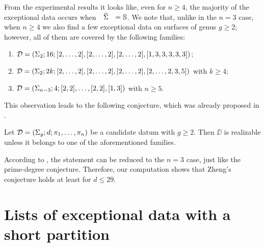 \egroup

From the experimental results it looks like, even for $n\ge 4$, the majority of the exceptional data occurs when $\tSigma=\sphere$. We note that, unlike in the $n=3$ case, when $n\ge 4$ we also find a few exceptional data on surfaces of genus $g\ge 2$; however,
all of them are covered by the following families:
\begin{enumerate}[(1)]
\item $\mathcal{D}=(\Sigma_{2};16;[2,\ldots,2],[2,\ldots,2],[2,\ldots,2],[1,3,3,3,3,3])$;
\item $\mathcal{D}=(\Sigma_{2};2k;[2,\ldots,2],[2,\ldots,2],[2,\ldots,2],[2,\ldots,2,3,5])$ with $k\ge 4$;
\item $\mathcal{D}=(\Sigma_{n-3};4;[2,2],\ldots,[2,2],[1,3])$ with $n\ge 5$.
\end{enumerate}
This observation leads to the following conjecture, which was already proposed in \cite{zheng}.
\begin{conjecture*}[Zheng]
Let $\mathcal{D}=(\Sigma_{g};d;\pi_1,\ldots,\pi_n)$ be a candidate datum with $g\ge 2$. Then $\DD$ is realizable unless it belongs to one of the aforementioned families.
\end{conjecture*}
According to \citeauthor{zheng}, the statement can be reduced to the $n=3$ case, just like the prime-degree conjecture. Therefore, our computation shows that Zheng's conjecture holds at least for $d\le 29$.

\section{Lists of exceptional data with a short partition}\label{computational-results:sc:lists}

